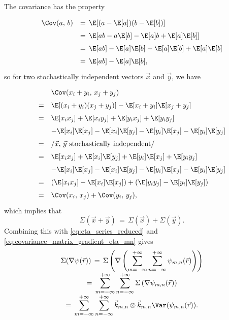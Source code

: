 The covariance has the property
%
\begin{equation}
\renewcommand*{\arraystretch}{1.5}
\begin{array}{rl}
\Cov(a,\,b)
& =\, \E[(a-\E[a])(b-\E[b])] \\
& =\, \E[ab - a\E[b] - \E[a]b + \E[a]\E[b]] \\
& =\, \E[ab] - \E[a]\E[b] - \E[a]\E[b] + \E[a]\E[b] \\
& =\, \E[ab] - \E[a]\E[b],
\end{array}
\end{equation}
%
so for two stochastically independent vectors $\vec{x}$ and $\vec{y}$, we have
%
\begin{equation}
\renewcommand*{\arraystretch}{1.5}
\begin{array}{cl}
  & \Cov(x_i+y_i,\,x_j+y_j) \\
= & \E[(x_i+y_i)(x_j+y_j)] - \E[x_i+y_i]\E[x_j+y_j] \\
= & \E[x_i x_j] + \E[x_i y_j] + \E[y_i x_j] + \E[y_i y_j] \\
  & - \E[x_i]\E[x_j] - \E[x_i]\E[y_j] - \E[y_i]\E[x_j] - \E[y_i]\E[y_j] \\
= & \left/ \vec{x},\, \vec{y}\ \text{stochastically independent}\right/ \\
= & \E[x_i x_j] + \E[x_i]\E[y_j] + \E[y_i]\E[x_j] + \E[y_i y_j] \\
  & - \E[x_i]\E[x_j] - \E[x_i]\E[y_j] - \E[y_i]\E[x_j] - \E[y_i]\E[y_j] \\
= & (\E[x_i x_j] - \E[x_i]\E[x_j]) + (\E[y_i y_j] - \E[y_i]\E[y_j]) \\
= & \Cov(x_i,\,x_j) + \Cov(y_i,\,y_j),
\end{array}
\end{equation}
%
which implies that
%
\begin{equation} \label{eq:covariance_matrix_sum}
\Sigma(\vec{x} + \vec{y}) \,=\, \Sigma(\vec{x}) + \Sigma(\vec{y}).
\end{equation}
%
Combining this with \eqref{eq:eta_series_reduced} and \eqref{eq:covariance_matrix_gradient_eta_mn} gives
%
\begin{equation} \label{eq:covariance_matrix_gradient_eta}
\renewcommand*{\arraystretch}{2}
\begin{array}{c}
\displaystyle \Sigma(\nabla\psi(\vec{r})) \,=\, \Sigma\left(\nabla\left(\sum_{m=-\infty}^{+\infty}\sum_{n=-\infty}^{+\infty} \psi_{m,n}(\vec{r})\right)\right) \\
\displaystyle =\, \sum_{m=-\infty}^{+\infty}\sum_{n=-\infty}^{+\infty}\Sigma\left(\nabla\psi_{m,n}(\vec{r})\right) \\ \displaystyle =\, \sum_{m=-\infty}^{+\infty}\sum_{n=-\infty}^{+\infty}\vec{k}_{m,n}\otimes\vec{k}_{m,n} \Var(\psi_{m,n}(\vec{r})).
\end{array}
\end{equation}

